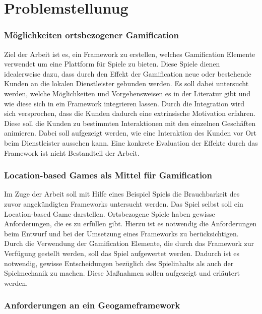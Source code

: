 \chapter{Problemstellunug}
\label{ch2:Problemstellunug}

\subsection*{Möglichkeiten ortsbezogener Gamification}

Ziel der Arbeit ist es, ein Framework zu erstellen, welches Gamification Elemente verwendet um eine Plattform für Spiele zu bieten. Diese Spiele dienen idealerweise dazu, dass durch den Effekt der Gamification neue oder bestehende Kunden an die lokalen Dienstleister gebunden werden. Es soll dabei untersucht werden, welche Möglichkeiten und Vorgehensweisen es in der Literatur gibt und wie diese sich in ein Framework integrieren lassen.
Durch die Integration wird sich versprochen, dass die Kunden dadurch eine extrinsische Motivation erfahren. Diese soll die Kunden zu bestimmten Interaktionen mit den einzelnen Geschäften animieren.
Dabei soll aufgezeigt werden, wie eine Interaktion des Kunden vor Ort beim Dienstleister aussehen kann. Eine konkrete Evaluation der Effekte durch das Framework ist nicht Bestandteil der Arbeit.

\subsection*{Location-based Games als Mittel für Gamification}

Im Zuge der Arbeit soll mit Hilfe eines Beispiel Spiels die Brauchbarkeit des zuvor angekündigten Frameworks untersucht werden.
Das Spiel selbst soll ein Location-based Game darstellen. Ortsbezogene Spiele haben gewisse Anforderungen, die es zu erfüllen gibt. Hierzu 
ist es notwendig die Anforderungen beim Entwurf und bei der Umsetzung eines Frameworks zu berücksichtigen.
Durch die Verwendung der Gamification Elemente, die durch das Framework zur Verfügung gestellt werden, soll das Spiel aufgewertet werden.
Dadurch ist es notwendig, gewisse Entscheidungen bezüglich des Spielinhalts als auch der Spielmechanik zu machen.
Diese Maßnahmen sollen aufgezeigt und erläutert werden.

\subsection*{Anforderungen an ein Geogameframework}

